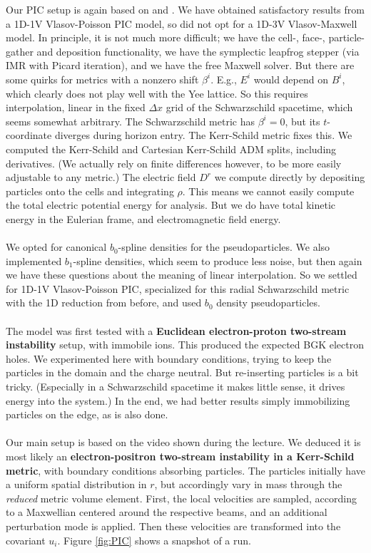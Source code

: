 \documentclass{article}
\begin{document}
Our PIC setup is again based on \cite{entity1} and \cite{entity2}.
We have obtained satisfactory results from a 1D-1V Vlasov-Poisson PIC model, so did not opt for a 1D-3V Vlasov-Maxwell model.
In principle, it is not much more difficult; we have the cell-, face-, particle-gather and deposition functionality,
we have the symplectic leapfrog stepper (via IMR with Picard iteration), and we have the free Maxwell solver.
But there are some quirks for metrics with a nonzero shift $\beta^i$. E.g., $E^i$ would depend on $B^i$, which clearly does not play well with the Yee lattice.
So this requires interpolation, linear in the fixed $\Delta x$ grid of the Schwarzschild spacetime, which seems somewhat arbitrary.
The Schwarzschild metric has $\beta^i=0$, but its $t$-coordinate diverges during horizon entry.
The Kerr-Schild metric fixes this.
We computed the Kerr-Schild and Cartesian Kerr-Schild ADM splits, including derivatives. (We actually rely on finite differences however, to be more easily adjustable to any metric.)
The electric field $D^r$ we compute directly by depositing particles onto the cells and integrating $\rho$.
This means we cannot easily compute the total electric potential energy for analysis. But we do have total kinetic energy in the Eulerian frame, and electromagnetic field energy.\\
\\
We opted for canonical $b_0$-spline densities for the pseudoparticles. We also implemented $b_1$-spline densities, which seem to produce less noise, but then again we have these questions about the meaning of linear interpolation. So we settled for 1D-1V Vlasov-Poisson PIC, specialized for this radial Schwarzschild metric with the 1D reduction from before, and used $b_0$ density pseudoparticles.\\
\\
The model was first tested with a \textbf{Euclidean electron-proton two-stream instability} setup, with immobile ions.
This produced the expected BGK electron holes.
We experimented here with boundary conditions, trying to keep the particles in the domain and the charge neutral.
But re-inserting particles is a bit tricky. (Especially in a Schwarzschild spacetime it makes little sense, it drives energy into the system.)
In the end, we had better results simply immobilizing particles on the edge, as is also done.\\
\\
Our main setup is based on the video shown during the lecture.
We deduced it is most likely an \textbf{electron-positron two-stream instability in a Kerr-Schild metric}, with boundary conditions absorbing particles.
The particles initially have a uniform spatial distribution in $r$, but accordingly vary in mass through the \textit{reduced} metric volume element.
First, the local velocities are sampled, according to a Maxwellian centered around the respective beams, and an additional perturbation mode is applied.
Then these velocities are transformed into the covariant $u_i$.
Figure \ref{fig:PIC} shows a snapshot of a run.
\end{document}
